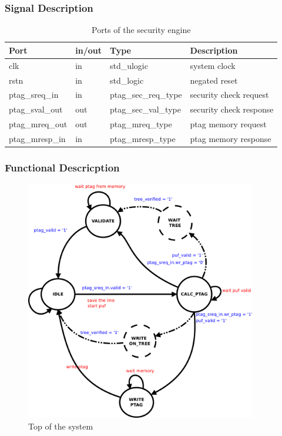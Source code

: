 \subsubsection{Signal Description}

\begin{table}[H]
\centering
\label{table:seports}
\begin{tabular}{l l l l}

\textbf{Port}   & \textbf{in/out} & \textbf{Type}        & \textbf{Description} 	\\ \hline \hline
clk             & in              & std\_ulogic          & system clock         	\\ \hline
rstn            & in              & std\_logic           & negated reset         	\\ \hline
ptag\_sreq\_in  & in              & ptag\_sec\_req\_type & security check request    	\\ \hline
ptag\_sval\_out & out             & ptag\_sec\_val\_type & security check response  	\\ \hline
ptag\_mreq\_out & out             & ptag\_mreq\_type 	 & ptag memory  request    	\\ \hline
ptag\_mresp\_in & in              & ptag\_mresp\_type 	 & ptag memory  response  	\\ \hline
\end{tabular}
 \caption{Ports of the security engine}
\end{table}




\subsubsection{Functional Descricption}
  \begin{figure}[H]
    \centering
    \includegraphics[width=0.90\textwidth]{figures/pdf/sec_engine_sm.pdf}
    \caption{Top of the system  }
    \label{fig:sesm}
\end{figure}


